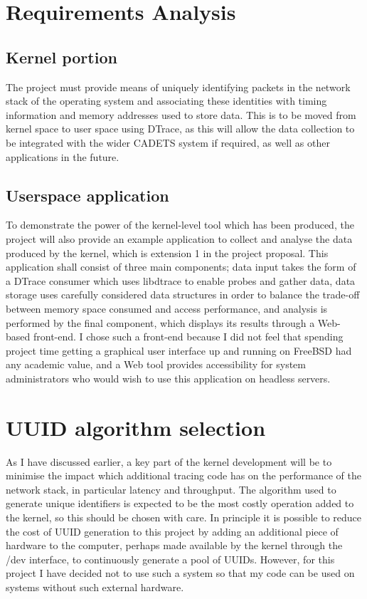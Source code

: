 \documentclass[a4paper,12pt,twoside,openright]{report}
\begin{document}
	\section{Requirements Analysis}
	
	\subsection{Kernel portion}
	
	The project must provide means of uniquely identifying packets in the network stack of the operating system and associating these identities with timing information and memory addresses used to store data. This is to be moved from kernel space to user space using DTrace, as this will allow the data collection to be integrated with the wider CADETS system if required, as well as other applications in the future.
	
	\subsection{Userspace application}
	
	To demonstrate the power of the kernel-level tool which has been produced, the project will also provide an example application to collect and analyse the data produced by the kernel, which is extension 1 in the project proposal. This application shall consist of three main components; data input takes the form of a DTrace consumer which uses libdtrace to enable probes and gather data, data storage uses carefully considered data structures in order to balance the trade-off between memory space consumed and access performance, and analysis is performed by the final component, which displays its results through a Web-based front-end. I chose such a front-end because I did not feel that spending project time getting a graphical user interface up and running on FreeBSD had any academic value, and a Web tool provides accessibility for system administrators who would wish to use this application on headless servers.
	
	\section{UUID algorithm selection}
	
	As I have discussed earlier, a key part of the kernel development will be to minimise the impact which additional tracing code has on the performance of the network stack, in particular latency and throughput. The algorithm used to generate unique identifiers is expected to be the most costly operation added to the kernel, so this should be chosen with care. In principle it is possible to reduce the cost of UUID generation to this project by adding an additional piece of hardware to the computer, perhaps made available by the kernel through the /dev interface, to continuously generate a pool of UUIDs. However, for this project I have decided not to use such a system so that my code can be used on systems without such external hardware.
	
\end{document}

